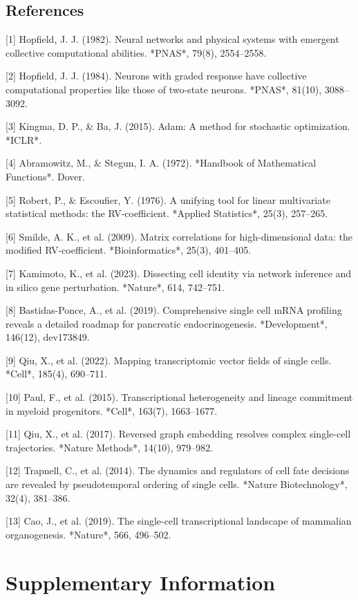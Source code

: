 \documentclass[11pt]{article}
\begin{document}
\subsection*{References}

[1] Hopfield, J. J. (1982). Neural networks and physical systems with emergent collective computational abilities. *PNAS*, 79(8), 2554--2558.

[2] Hopfield, J. J. (1984). Neurons with graded response have collective computational properties like those of two-state neurons. *PNAS*, 81(10), 3088--3092.

[3] Kingma, D. P., \& Ba, J. (2015). Adam: A method for stochastic optimization. *ICLR*.

[4] Abramowitz, M., \& Stegun, I. A. (1972). *Handbook of Mathematical Functions*. Dover.

[5] Robert, P., \& Escoufier, Y. (1976). A unifying tool for linear multivariate statistical methods: the RV-coefficient. *Applied Statistics*, 25(3), 257--265.

[6] Smilde, A. K., et al. (2009). Matrix correlations for high-dimensional data: the modified RV-coefficient. *Bioinformatics*, 25(3), 401--405.

[7] Kamimoto, K., et al. (2023). Dissecting cell identity via network inference and in silico gene perturbation. *Nature*, 614, 742--751.

[8] Bastidas-Ponce, A., et al. (2019). Comprehensive single cell mRNA profiling reveals a detailed roadmap for pancreatic endocrinogenesis. *Development*, 146(12), dev173849.

[9] Qiu, X., et al. (2022). Mapping transcriptomic vector fields of single cells. *Cell*, 185(4), 690--711.

[10] Paul, F., et al. (2015). Transcriptional heterogeneity and lineage commitment in myeloid progenitors. *Cell*, 163(7), 1663--1677.

[11] Qiu, X., et al. (2017). Reversed graph embedding resolves complex single-cell trajectories. *Nature Methods*, 14(10), 979--982.

[12] Trapnell, C., et al. (2014). The dynamics and regulators of cell fate decisions are revealed by pseudotemporal ordering of single cells. *Nature Biotechnology*, 32(4), 381--386.

[13] Cao, J., et al. (2019). The single-cell transcriptional landscape of mammalian organogenesis. *Nature*, 566, 496--502.


\clearpage
\section*{Supplementary Information}
\end{document}
